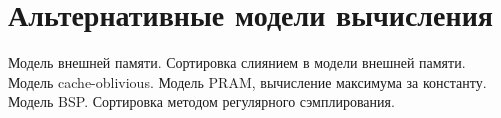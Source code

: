 \section{Альтернативные модели вычисления}
Модель внешней памяти.
Сортировка слиянием в модели внешней памяти.
Модель cache-oblivious.
Модель PRAM, вычисление максимума за константу.
Модель BSP.
Сортировка методом регулярного сэмплирования.

